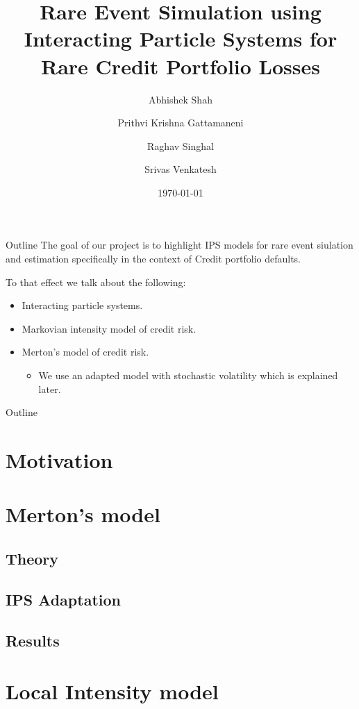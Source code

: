 \documentclass{beamer}
\title{Rare Event Simulation using Interacting Particle Systems for Rare Credit Portfolio Losses}
\author{
  Abhishek Shah \\
  \and
  Prithvi Krishna Gattamaneni\\
  \and
  Raghav Singhal\\
  \and
  Srivas Venkatesh \\
}
\institute[New York University] %
{
  Courant Institute of Mathematical Sciences\\
  New York University\\
}
\date{\today}
\begin{document}
\begin{frame}
	\titlepage
\end{frame}


\begin{frame}{Outline}
	The goal of our project is to highlight IPS models for rare event siulation
	and estimation specifically in the context of Credit portfolio defaults.
																
	To that effect we talk about the following:
	\begin{itemize}
		\item Interacting particle systems.
		\item Markovian intensity model of credit risk.
		\item Merton's model of credit risk.
		      \begin{itemize}
		      	\item We use an adapted model with stochastic volatility which
		      	      is explained later.
		      \end{itemize}
	\end{itemize}
\end{frame}

\begin{frame}{Outline}
	\tableofcontents
\end{frame}

\section{Motivation}

\section{Merton's model}
\subsection{Theory}

\subsection{IPS Adaptation}

\subsection{Results}

\section{Local Intensity model}
\end{document}
